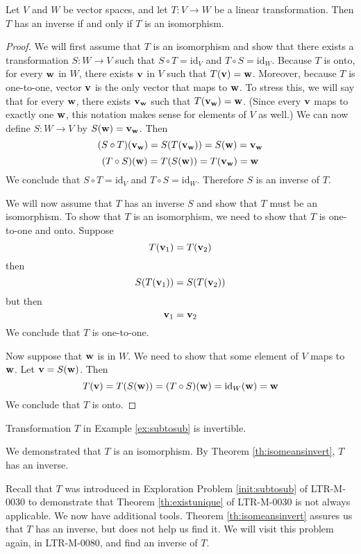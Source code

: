\documentclass{ximera}
\renewcommand{\vec}[1]{{\bf #1}}
\newcommand{\id}{\text{id}}
\begin{document}
\begin{theorem}\label{th:isomeansinvert} Let $V$ and $W$ be vector spaces, and let $T:V\rightarrow W$ be a linear transformation.  Then $T$ has an inverse if and only if $T$ is an isomorphism. 
\end{theorem}
\begin{proof}
We will first assume that $T$ is an isomorphism and show that there exists a transformation $S:W\rightarrow V$ such that $S\circ T=\id_V$ and $T\circ S=\id_W$.  Because $T$ is onto, for every $\vec{w}$ in $W$, there exists $\vec{v}$ in $V$ such that $T(\vec{v})=\vec{w}$.  Moreover, because $T$ is one-to-one, vector $\vec{v}$ is the only vector that maps to $\vec{w}$.  To stress this, we will say that for every $\vec{w}$, there exists $\vec{v}_{\vec{w}}$ such that $T(\vec{v}_{\vec{w}})=\vec{w}$. (Since every $\vec{v}$ maps to exactly one $\vec{w}$, this notation makes sense for elements of $V$ as well.)  We can now define $S:W\rightarrow V$ by $S(\vec{w})=\vec{v}_{\vec{w}}$.
Then
$$(S\circ T)(\vec{v}_{\vec{w}})=S(T(\vec{v}_{\vec{w}}))=S(\vec{w})=\vec{v}_{\vec{w}}$$
$$(T\circ S)(\vec{w})=T(S(\vec{w}))=T(\vec{v}_{\vec{w}})=\vec{w}$$
We conclude that $S\circ T=\id_V$ and $T\circ S=\id_W$.  Therefore $S$ is an inverse of $T$.

We will now assume that $T$ has an inverse $S$ and show that $T$ must be an isomorphism.  To show that $T$ is an isomorphism, we need to show that $T$ is one-to-one and onto.
Suppose $$T(\vec{v}_1)=T(\vec{v}_2)$$ then $$S(T(\vec{v}_1))=S(T(\vec{v}_2))$$
but then
$$\vec{v}_1=\vec{v}_2$$
We conclude that $T$ is one-to-one.

Now suppose that $\vec{w}$ is in $W$.  We need to show that some element of $V$ maps to $\vec{w}$.  Let $\vec{v}=S(\vec{w})$.  Then
$$T(\vec{v})=T(S(\vec{w}))=(T\circ S)(\vec{w})=\id_W(\vec{w})=\vec{w}$$
We conclude that $T$ is onto.
\end{proof}

\begin{example}\label{ex:subtosubinvert}
Transformation $T$ in Example \ref{ex:subtosub} is invertible.
\begin{explanation}
We demonstrated that $T$ is an isomorphism.  By Theorem \ref{th:isomeansinvert}, $T$ has an inverse.  

Recall that $T$ was introduced in Exploration Problem \ref {init:subtosub} of LTR-M-0030 to demonstrate that Theorem \ref{th:existunique} of LTR-M-0030 is not always applicable.  We now have additional tools. Theorem \ref{th:isomeansinvert} assures us that $T$ has an inverse, but does not help us find it. We will visit this problem again, in LTR-M-0080, and find an inverse of $T$.
\end{explanation}
\end{example}
\end{document}
